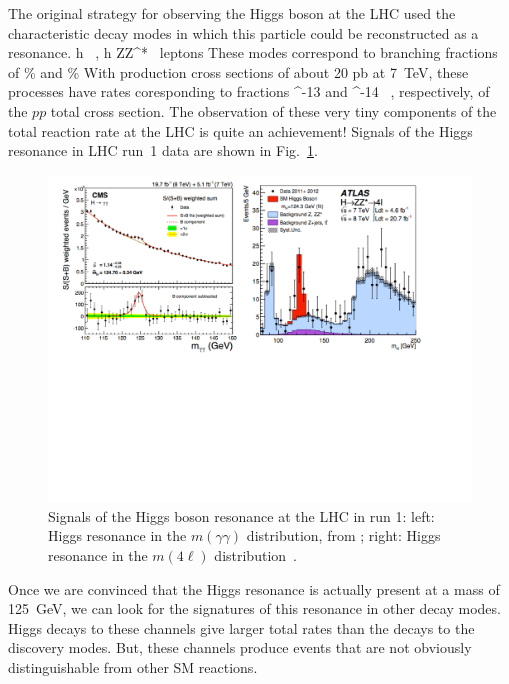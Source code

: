 \documentclass[12pt]{article}
\begin{document}
The original strategy for observing the Higgs boson at the LHC used
the characteristic decay modes in which this particle could be
reconstructed as a resonance.
\beq
    h \to \gamma\gamma  \ ,   \qquad h \to ZZ^* ~\mbox{leptons}
\eeqn
These modes correspond to branching fractions of 
\%   \qquad \mbox{and}  \%
\eeqn 
With production cross sections of about 20 pb at 7~TeV,
these processes have rates coresponding to fractions
^{-13} \qquad \mbox{and}   ^{-14}
        \ , 
\eeqn
respectively, of the $pp$ total cross section.  The observation of
these very tiny components of the total reaction rate at the LHC is
quite an achievement!  Signals of the
Higgs resonance in LHC run~1 data are shown in
Fig.~\ref{fig:Higgsres}. 

\begin{figure}
\begin{center}
\includegraphics[width=0.95\hsize]{Higgsres.pdf}
\end{center}
\caption{Signals of the Higgs boson resonance at the LHC in run 1: left:
  Higgs resonance in the $m(\gamma\gamma)$ distribution, from \cite{CMSgamgam};
   right: Higgs resonance in the $m(4\ell)$ distribution~\cite{ATLASPLZZ}.}
\label{fig:Higgsres}
\end{figure}



Once we are convinced that the Higgs resonance is actually present at
a mass of 125~GeV, we can look for the signatures of this resonance in
other decay modes.   Higgs decays to these channels give  larger total
rates than the decays to the discovery modes.  But, these channels produce events
that are not obviously distinguishable from other SM reactions.
\end{document}
